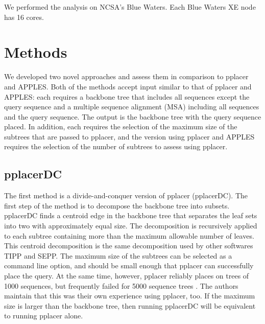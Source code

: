 \documentclass[10pt]{article}
\begin{document}
We performed the analysis on NCSA's Blue Waters. Each Blue Waters XE node has 16 cores.


\section{Methods}

We developed two novel approaches and assess them in comparison to pplacer and APPLES.
Both of the methods accept input similar to that of pplacer and APPLES:
each requires a backbone tree that includes all sequences except the query sequence and a multiple sequence alignment (MSA) including all sequences and the query sequence.
The output is the backbone tree with the query sequence placed.
In addition, each requires the selection of the maximum size of the subtrees that are passed to pplacer, and the version using pplacer and APPLES requires the selection of the number of subtrees to assess using pplacer.

\subsection{pplacerDC}

The first method is a divide-and-conquer version of pplacer (pplacerDC).
The first step of the method is to decompose the backbone tree into subsets.
pplacerDC finds a centroid edge in the backbone tree that separates the leaf
sets into two with approximately equal size.
The decomposition is recursively applied to each subtree containing more
than the maximum allowable number of leaves.
This centroid decomposition is the same decomposition used by other softwares TIPP and SEPP\cite{nguyen_tipp_2014}.
The maximum size of the subtrees can be selected as a command line option, and should be small enough that pplacer can successfully place the query.
At the same time, however, 
pplacer reliably places on trees of 1000 sequences, but frequently failed for 5000 sequence trees \cite{balaban_apples_2020}.
The authors maintain that this was their own experience using pplacer, too.
If the maximum size is larger than the backbone tree, then running pplacerDC will be equivalent to running pplacer alone.
\end{document}
